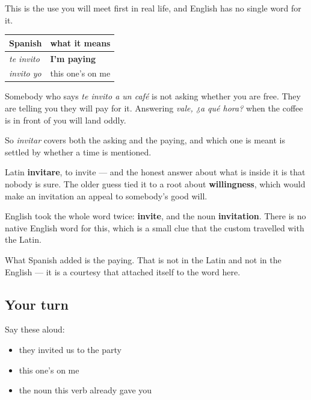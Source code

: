 \begin{grammarlens}[title={Grammar Lens: in Spanish, inviting can mean paying}]
This is the use you will meet first in real life, and English has no single word for it.

\noindent
\begin{tabularx}{\linewidth}{@{}>{\raggedright\arraybackslash}X>{\raggedright\arraybackslash}X@{}}
\toprule
\textbf{Spanish} & \textbf{what it means} \\
\midrule
\emph{te invito} & \textbf{I'm paying} \\
\emph{invito yo} & this one's on me \\
\bottomrule
\end{tabularx}

Somebody who says \emph{te invito a un café} is not asking whether you are free. They are telling you they will pay for it. Answering \emph{vale, ¿a qué hora?} when the coffee is in front of you will land oddly.

So \emph{invitar} covers both the asking and the paying, and which one is meant is settled by whether a time is mentioned.
\end{grammarlens}

\begin{cousinweb}
Latin \textbf{invitare}, to invite — and the honest answer about what is inside it is that nobody is sure. The older guess tied it to a root about \textbf{willingness}, which would make an invitation an appeal to somebody's good will.

English took the whole word twice: \textbf{invite}, and the noun \textbf{invitation}. There is no native English word for this, which is a small clue that the custom travelled with the Latin.

What Spanish added is the paying. That is not in the Latin and not in the English — it is a courtesy that attached itself to the word here.
\end{cousinweb}

\subsection*{Your turn}
Say these aloud:

\begin{itemize}
\raggedright
  \item they invited us to the party
  \item this one's on me
  \item the noun this verb already gave you
\end{itemize}

